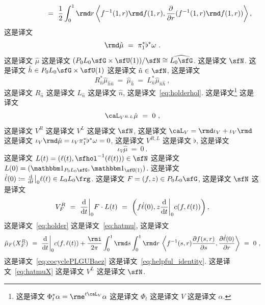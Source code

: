 \documentclass[
    affil-it, %
    auth-lg, %
    british, %
    compression, %
    contents, %
    custom-packages={}, %
    references={bigone}, %
]{lib/preprint}
\newcommand{\boundary}{\flat}
\begin{document}
\begin{body}
\begin{subequations}
\begin{equation}
\begin{aligned}
                    \\
                    &\kern2cm=\ \frac{1}{2}\int_0^1\rmd r\innerLarge{f^{-1}(1,r)\rmd f(1,r)}{\parder{r}(f^{-1}(1,r)\rmd f(1,r))},
                \end{aligned}
            \end{equation}
        \end{subequations}  这是译文 
        \begin{equation}\label{eq:dofmu}
            \rmd\hat\mu\ =\ \pi_1^*\boundary^*\omega~.
        \end{equation}  这是译文 $\hat\mu$ 这是译文 $(P_0L_0\sfG\times\sfU(1))/\sfN\cong\widehat{L_0\sfG}$. 这是译文 $\sfN$. 这是译文 $\hat h\in P_0L_0\sfG\times\sfU(1)$ 这是译文 $\hat n\in\sfN$, 这是译文         \begin{equation}\label{eq:muinvar}
            R^*_{\hat n}\hat\mu_{\hat h\hat n}\ =\ \hat\mu_{\hat h}\ =\ L^*_{\hat n}\hat\mu_{\hat n \hat h}~,
        \end{equation}  这是译文 $R_{\hat n}$ 这是译文 $ L_{\hat n} $ 这是译文 $\hat n$, 这是译文~\eqref{eq:holderhol}. 这是译文\footnote{这是译文 $\Phi_t^*\alpha=\rme^{t\caL_V}\alpha$ 这是译文 $\Phi_t$ 这是译文 $V$ 这是译文 $\alpha$.} 这是译文 
        \begin{equation}
            \caL_{V^{R,L}}\hat \mu\ =\ 0 ~,
        \end{equation}  这是译文 $V^R$ 这是译文 $V^L$ 这是译文 $\sfN$, 这是译文 $\caL_V=\rmd\iota_V+\iota_V\rmd$ 这是译文 $\iota_V\rmd\hat\mu =\iota_V\pi_1^*\boundary^*\omega=0$, 这是译文 $V^{R,L}$ 这是译文 $\boundary$, 这是译文         \begin{equation}\label{eq:hatmuX}
            \iota_V\hat\mu\ =\ 0~.
        \end{equation}  这是译文 $L(t)=(\ell(t),\sfhol^{-1}(\ell(t)))\in\sfN$ 这是译文 $L(0)=(\unit_{P_0L_0\sfG},\unit_{\sfU(1)})$. 这是译文 $\dot\ell(0)\coloneqq\dder{t}\big|_0\ell(t)\in L_0L_0\frg$. 这是译文 $F=(f,z)\in P_0L_0\sfG$, 这是译文 $\sfN$ 这是译文         \begin{equation}
            V^R_F\ =\ \dder{t}\bigg|_0F\cdot L(t)\ =\ \left(f\dot\ell(0),z\dder{t}\bigg|_0c(f,\ell(t))\right),
        \end{equation}  这是译文~\eqref{eq:holder} 这是译文~\eqref{eq:hatmu}, 这是译文         \begin{equation}\label{eq:hatmuX_explicit}
            \hat\mu_F (X_F^R)\ =\ \dder{t}\bigg|_0 c(f,\ell(t))+\frac{\rmi}{2\pi}\int_0^1\rmd s\int_0^1\rmd r\,\innerLarge{f^{-1}(s,r)\parder[f(s,r)]{s}}{\parder[\dot \ell(0)]{r}}\ =\ 0~,
        \end{equation}  这是译文~\eqref{eq:cocyclePLGUBaez} 这是译文~\eqref{eq:helpful_identity}. 这是译文~\eqref{eq:hatmuX} 这是译文 $ V^L $ 这是译文 $ \sfN $. 
        

\end{body}
\end{document}
